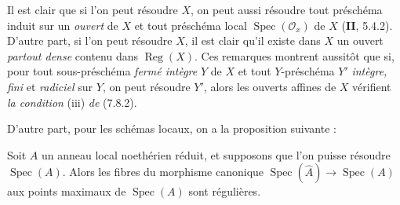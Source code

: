 \begin{env}[7.9.2]
\label{IV.2.s7.9.2-fr}
Il est clair que si l'on peut résoudre $X$, on peut aussi résoudre tout
préschéma induit sur un \emph{ouvert} de $X$ et tout préschéma local
$\operatorname{Spec}(\mathcal O_x)$ de $X$ (\textbf{II}, 5.4.2). D'autre part,
si l'on peut résoudre $X$, il est clair qu'il existe dans $X$ un ouvert
\emph{partout dense} contenu dans $\operatorname{Reg}(X)$. Ces remarques
montrent aussitôt que si, pour tout sous-préschéma \emph{fermé intègre} $Y$ de
$X$ et tout $Y$-préschéma $Y'$ \emph{intègre, fini} et \emph{radiciel} sur
$Y$, on peut résoudre $Y'$, alors les ouverts affines de $X$ vérifient
\emph{la condition} (iii) \emph{de} (7.8.2).

D'autre part, pour les schémas locaux, on a la proposition suivante :
\end{env}

\begin{proposition}[7.9.3]
\label{IV.2.s7.9.3-fr}
Soit $A$ un anneau local noethérien réduit, et supposons que l'on puisse
résoudre $\operatorname{Spec}(A)$. Alors les fibres du morphisme canonique
$\operatorname{Spec}(\widehat A)\to\operatorname{Spec}(A)$ aux points maximaux
de $\operatorname{Spec}(A)$ sont régulières.
\end{proposition}

